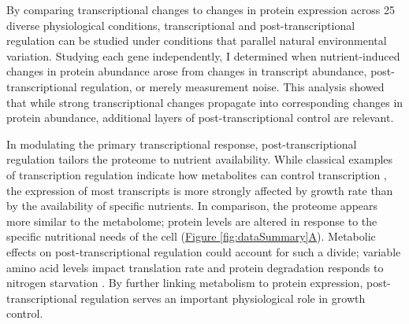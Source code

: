 By comparing transcriptional changes to changes in protein expression across 25 diverse physiological conditions, transcriptional and post-transcriptional regulation can be studied under conditions that parallel natural environmental variation.  Studying each gene independently, I determined when nutrient-induced changes in protein abundance arose from changes in transcript abundance, post-transcriptional regulation, or merely measurement noise. This analysis showed that while strong transcriptional changes propagate into corresponding changes in protein abundance, additional layers of post-transcriptional control are relevant.

In modulating the primary transcriptional response, post-transcriptional regulation tailors the proteome to nutrient availability. While classical examples of transcription regulation indicate how metabolites can control transcription \cite{Jacob:1961du, Jones:1982dn}, the expression of most transcripts is more strongly affected by growth rate than by the availability of specific nutrients.  In comparison, the proteome appears more similar to the metabolome; protein levels are altered in response to the specific nutritional needs of the cell (\hyperref[fig:dataSummary]{Figure \ref{fig:dataSummary}A}). Metabolic effects on post-transcriptional regulation could account for such a divide; variable amino acid levels impact translation rate \cite{Klumpp:2009ic} and protein degradation responds to nitrogen starvation \cite{Zundel:2009dy, Xu:2013do}. By further linking metabolism to protein expression, post-transcriptional regulation serves an important physiological role in growth control.


